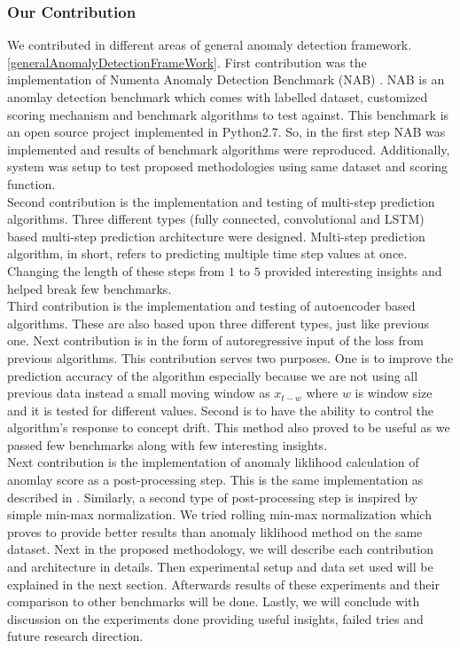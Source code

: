 \documentclass[12pt]{article}
\begin{document}
\subsubsection{Our Contribution}
We contributed in different areas of general anomaly detection framework.\ref{generalAnomalyDetectionFrameWork}. First contribution was the implementation of Numenta Anomaly Detection Benchmark (NAB) \cite{NAB}. NAB is an anomlay detection benchmark which comes with labelled dataset, customized scoring mechanism and benchmark algorithms to test against. This benchmark is an open source project implemented in Python2.7. So, in the first step NAB was implemented and results of benchmark algorithms were reproduced. Additionally, system was setup to test proposed methodologies using same dataset and scoring function.\\
\break
Second contribution is the implementation and testing of multi-step prediction algorithms. Three different types (fully connected, convolutional and LSTM) based multi-step prediction architecture were designed. Multi-step prediction algorithm, in short, refers to predicting multiple time step values at once. Changing the length of these steps from $1$ to $5$ provided interesting insights and helped break few benchmarks.\\
\break 
Third contribution is the implementation and testing of autoencoder based algorithms. These are also based upon three different types, just like previous one. Next contribution is in the form of autoregressive input of the loss from previous algorithms. This contribution serves two purposes. One is to improve the prediction accuracy of the algorithm especially because we are not using all previous data instead a small moving window as $x_{t-w}$ where $w$ is window size and it is tested for different values. Second is to have the ability to control the algorithm's response to concept drift. This method also proved to be useful as we passed few benchmarks along with few interesting insights.
\\
\break
Next contribution is the implementation of anomaly liklihood calculation of anomlay score as a post-processing step. This is the same implementation as described in \cite{ahmad2017unsupervised}. Similarly, a second type of post-processing step is inspired by simple min-max normalization. We tried rolling min-max normalization which proves to provide better results than anomaly liklihood method on the same dataset.
Next in the proposed methodology, we will describe each contribution and architecture in details. Then experimental setup and data set used will be explained in the next section. Afterwards results of these experiments and their comparison to other benchmarks will be done. Lastly, we will conclude with discussion on the experiments done providing useful insights, failed tries and future research direction.
\newpage
\end{document}
